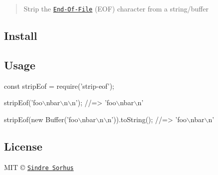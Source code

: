 \begin{quote}
Strip the \href{https://en.wikipedia.org/wiki/End-of-file}{\tt End-\/\+Of-\/\+File} (E\+OF) character from a string/buffer \end{quote}


\subsection*{Install}




\subsection*{Usage}


\begin{DoxyCode}
const stripEof = require('strip-eof');

stripEof('foo\(\backslash\)nbar\(\backslash\)n\(\backslash\)n');
//=> 'foo\(\backslash\)nbar\(\backslash\)n'

stripEof(new Buffer('foo\(\backslash\)nbar\(\backslash\)n\(\backslash\)n')).toString();
//=> 'foo\(\backslash\)nbar\(\backslash\)n'
\end{DoxyCode}


\subsection*{License}

M\+IT © \href{http://sindresorhus.com}{\tt Sindre Sorhus} 